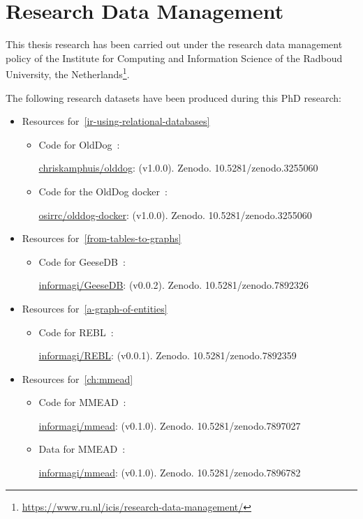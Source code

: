 \chapter*{Research Data Management}
\label{chp:research_data_management}

This thesis research has been carried out under the research data management policy of the Institute for Computing and Information Science of the Radboud University, the Netherlands\footnote{\url{https://www.ru.nl/icis/research-data-management/}}.

The following research datasets have been produced during this PhD research:

\begin{itemize}
	\item Resources for~\cref{ir-using-relational-databases}
	\begin{itemize}
		\item Code for OldDog~\citep{olddog-docker}:
		
		\href{https://doi.org/10.5281/zenodo.7892260}{chriskamphuis/olddog}: (v1.0.0). Zenodo. 10.5281/zenodo.3255060
		
		\item Code for the OldDog docker~\citep{olddog-docker}:
		
		\href{https://doi.org/10.5281/zenodo.3255060}{osirrc/olddog-docker}: (v1.0.0). Zenodo. 10.5281/zenodo.3255060
	\end{itemize}
	
	\item Resources for~\cref{from-tables-to-graphs}
	\begin{itemize}
		\item Code for GeeseDB~\citep{geesedb}:
		
		\href{https://doi.org/10.5281/zenodo.7892326}{informagi/GeeseDB}: (v0.0.2). Zenodo. 10.5281/zenodo.7892326
	\end{itemize}
	
	\item Resources for~\cref{a-graph-of-entities}
	\begin{itemize}
		\item Code for REBL~\citep{rebl}:
		
		\href{https://doi.org/10.5281/zenodo.7892359}{informagi/REBL}: (v0.0.1). Zenodo. 10.5281/zenodo.7892359
	\end{itemize}
	
	\item Resources for~\cref{ch:mmead}
	\begin{itemize}
		\item Code for MMEAD~\citep{mmead}:
		
		\href{https://doi.org/10.5281/zenodo.7897027}{informagi/mmead}: (v0.1.0). Zenodo. 10.5281/zenodo.7897027
		
		\item Data for MMEAD~\citep{mmead}:
		
		\href{https://doi.org/10.5281/zenodo.7896782}{informagi/mmead}: (v0.1.0). Zenodo. 10.5281/zenodo.7896782
	\end{itemize}
	
\end{itemize}
